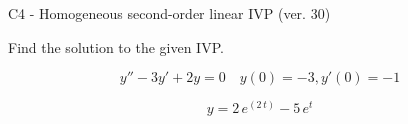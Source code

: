\begin{exercise}
  \begin{exerciseTitle}C4 - Homogeneous second-order linear IVP (ver. 30)\end{exerciseTitle}
  \begin{exerciseStatement}
    
Find the solution to the given IVP.

    
\[y''-3y'+2y = 0 \hspace{1em} y(0) = -3 , y'(0) = -1\]

  \end{exerciseStatement}
  \begin{exerciseAnswer}
    
\[y= 2 \, e^{\left(2 \, t\right)} - 5 \, e^{t}\]

  \end{exerciseAnswer}
\end{exercise}
